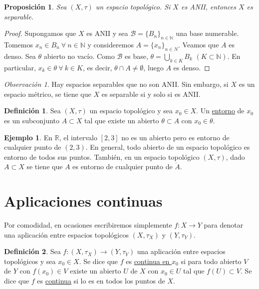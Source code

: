 \documentclass[12pt]{report}
\newtheorem{proposition}{Proposición}[chapter]
\theoremstyle{definition}
\newtheorem{definition}{Definición}[chapter]
\theoremstyle{definition}
\newtheorem{example}{Ejemplo}[chapter]
\theoremstyle{remark}
\newtheorem*{obs}{Observación} %
\newcommand{\R}{\mathbb R}
\newcommand{\N}{\mathbb N}
\begin{document}
\begin{proposition}
Sea $(X,\tau)$ un espacio topológico. Si $X$ es ANII, entonces $X$ es separable.
\end{proposition}

\begin{proof}
Supongamos que $X$ es ANII y sea $\mathcal{B} = \{B_n\}_{n \in \N}$ una base numerable. Tomemos $x_n \in B_n \ \forall \ n \in \N$ y consideremos $A = \{x_n\}_{n \in N}$. Veamos que $A$ es denso. Sea $\theta$ abierto no vacío. Como $\mathcal{B}$ es base, $\theta = \bigcup_{k \in K}B_k$ $(K \subset \N)$. En particular, $x_k \in \theta \ \forall \ k \in K$, es decir, $\theta \cap A \neq \emptyset$, luego $A$ es denso.
\end{proof}

\begin{obs}
Hay espacios separables que no son ANII. Sin embargo, si $X$ es un espacio métrico, se tiene que $X$ es separable si y solo si es ANII.
\end{obs}

\vspace{2mm}
\begin{definition}
Sea $(X,\tau)$ un espacio topológico y sea $x_0 \in X$. Un \underline{entorno} de $x_0$ es un subconjunto $A \subset X$ tal que existe un abierto $\theta \subset A$ con $x_0 \in \theta$.
\end{definition}

\begin{example}
En $\R$, el intervalo $[2,3]$ no es un abierto pero es entorno de cualquier punto de $(2,3)$. En general, todo abierto de un espacio topológico es entorno de todos sus puntos. También, en un espacio topológico $(X,\tau)$, dado $A \subset X$ se tiene que $A$ es entorno de cualquier punto de $\mathring{A}$.
\end{example}

\section{Aplicaciones continuas}

Por comodidad, en ocasiones escribiremos simplemente $f \colon X \to Y$ para denotar una aplicación entre espacios topológicos $(X,\tau_X)$ y $(Y,\tau_Y)$.

\begin{definition}
Sea $f \colon (X,\tau_X) \to (Y,\tau_Y)$ una aplicación entre espacios topológicos y sea $x_0 \in X$. Se dice que $f$ es \underline{continua en $x_0$} si para todo abierto $V$ de $Y$ con $f(x_0) \in V$ existe un abierto $U$ de $X$ con $x_0 \in U$ tal que $f(U) \subset V$. Se dice que $f$ es \underline{continua} si lo es en todos los puntos de $X$.
\end{definition}
\end{document}

